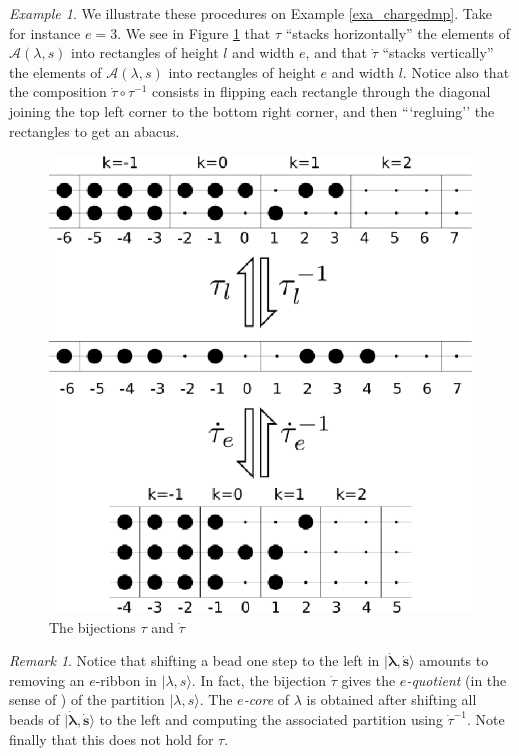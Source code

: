 \documentclass[twoside,12pt]{amsart}
\theoremstyle{plain}
\newcommand{\cA}{\mathcal{A}}
\newcommand{\bs}{\mathbf{s}}
\newcommand{\la}{\lambda}
\newcommand{\bla}{\boldsymbol{\la}}
\newcommand{\dtau}{\dot{\tau}}
\newcommand{\dbs}{\dot{\bs}}
\newcommand{\dbla}{\dot{\bla}}
\theoremstyle{remark}
\newtheorem{exa}[num]{Example}
\newtheorem{rem}[num]{Remark}
\begin{document}
\begin{exa}
We illustrate these procedures on Example \ref{exa_chargedmp}.
Take for instance $e=3$.
We see in Figure \ref{ab16} that $\tau$ ``stacks horizontally'' the elements of $\cA(\la,s)$ into
rectangles of height $l$ and width $e$, and that 
$\dtau$ ``stacks vertically'' the elements of $\cA(\la,s)$ into
rectangles of height $e$ and width $l$.
Notice also that the composition $\dtau \circ \tau^{-1}$ consists in
flipping each rectangle through the diagonal joining the top left corner to 
the bottom right corner, and then ```regluing'' the rectangles to get an abacus.
\begin{figure}[H] 
\includegraphics{images/abaque16.eps}
\caption{The bijections $\tau$ and $\dtau$}
\label{ab16}
\end{figure}
\end{exa}

\begin{rem}\label{rem_ribbon}
Notice that shifting a bead one step to the left in $|\dbla,\dbs\rangle$ amounts to removing an $e$-ribbon in $|\la,s\rangle$.
In fact, the bijection $\dtau$ gives the \textit{$e$-quotient} (in the sense of \cite{JamesKerber1984})
of the partition $|\la,s\rangle$.
The \textit{$e$-core} of $\la$ is obtained after shifting all beads of $|\dbla,\dbs\rangle$ to the left
and computing the associated partition using $\dtau^{-1}$.
Note finally that this does not hold for $\tau$.
\end{rem}
\end{document}
